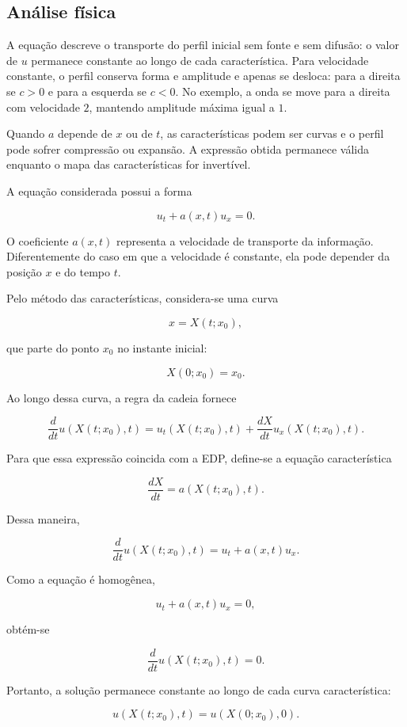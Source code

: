 \documentclass[
    12pt,
    oneside,
    a4paper,
    english,
    brazilian,
    chapter=TITLE,
    sumario=tradicional
]{abntex2}
\begin{document}
\subsection{Análise física}

A equação descreve o transporte do perfil inicial sem fonte e sem difusão:
o valor de $u$ permanece constante ao longo de cada característica. Para
velocidade constante, o perfil conserva forma e amplitude e apenas se
desloca: para a direita se $c>0$ e para a esquerda se $c<0$. No exemplo,
a onda se move para a direita com velocidade $2$, mantendo amplitude máxima
igual a $1$.

Quando $a$ depende de $x$ ou de $t$, as características podem ser curvas e o
perfil pode sofrer compressão ou expansão. A expressão obtida permanece
válida enquanto o mapa das características for invertível.

\iffalse
A equação considerada possui a forma

\[
    u_t+a(x,t)u_x=0.
\]

O coeficiente $a(x,t)$ representa a velocidade de transporte da informação.
Diferentemente do caso em que a velocidade é constante, ela pode depender da
posição $x$ e do tempo $t$.

Pelo método das características, considera-se uma curva

\[
    x=X(t;x_0),
\]

que parte do ponto $x_0$ no instante inicial:

\[
    X(0;x_0)=x_0.
\]

Ao longo dessa curva, a regra da cadeia fornece

\[
    \frac{d}{dt}u(X(t;x_0),t)
    =
    u_t(X(t;x_0),t)
    +
    \frac{dX}{dt}u_x(X(t;x_0),t).
\]

Para que essa expressão coincida com a EDP, define-se a equação
característica

\[
    \frac{dX}{dt}
    =
    a(X(t;x_0),t).
\]

Dessa maneira,

\[
    \frac{d}{dt}u(X(t;x_0),t)
    =
    u_t+a(x,t)u_x.
\]

Como a equação é homogênea,

\[
    u_t+a(x,t)u_x=0,
\]

obtém-se

\[
    \frac{d}{dt}u(X(t;x_0),t)=0.
\]

Portanto, a solução permanece constante ao longo de cada curva
característica:

\[
    u(X(t;x_0),t)
    =
    u(X(0;x_0),0).
\]
\end{document}
